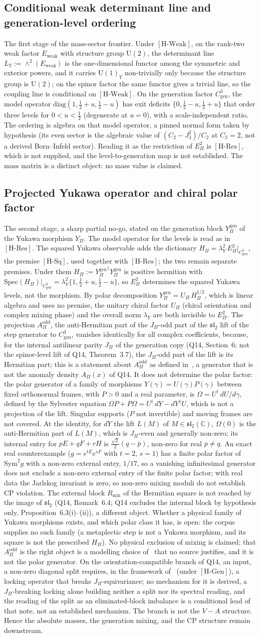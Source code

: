 \documentclass[11pt,a4paper]{article}
\theoremstyle{definition}
\newcommand{\UU}{\mathrm{U}}
\newcommand{\Epi}{E_\Pi}
\newcommand{\Cgen}{C^3_{\mathrm{gen}}}
\newcommand{\Ew}{E_{\mathrm{weak}}}
\newcommand{\HWeak}{\ensuremath{[\mathrm{H\text{-}Weak}]}}
\newcommand{\HRes}{\ensuremath{[\mathrm{H\text{-}Res}]}}
\newcommand{\HSq}{\ensuremath{[\mathrm{H\text{-}Sq}]}}
\newcommand{\HGen}{\ensuremath{[\mathrm{H\text{-}Gen}]}}
\newcommand{\Ypi}{Y_\Pi}
\newcommand{\Ygen}{{Y^{\mathrm{gen}}_\Pi}}
\newcommand{\AOdd}{A_\Pi^{\mathrm{odd}}}
\newcommand{\AClause}{%
  The projection $\AOdd$, the anti-Hermitian part of the $J_\Pi$-odd part of the $\mathfrak{sl}_2$ lift of the step
  generator to $\Cgen$, vanishes identically for all complex coefficients, because, for the internal antilinear
  parity $J_\Pi$ of the generation copy (Q14, Section~6; not the spinor-level lift of Q14, Theorem~3.7), the
  $J_\Pi$-odd part of the lift is its Hermitian part; this is a statement about $\AOdd$ as defined
  in~\cite{Beau2026pyo}, a generator that is not the anomaly density $A_\Pi(x)$ of Q14.
  It does not determine the polar factor: the polar generator of a family of morphisms $Y(\gamma)=U(\gamma)P(\gamma)$
  between fixed orthonormal frames, with $P>0$ and a real parameter, is $\Omega=U^\dagger\,dU/d\gamma$, defined by the
  Sylvester equation $\Omega P+P\Omega=U^\dagger\,dY-dY^\dagger U$, which is not a projection of the lift.
  Singular supports ($P$ not invertible) and moving frames are not covered.
  At the identity, for $dY$ the lift $L(M)$ of $M\in\mathfrak{sl}_2(\mathbb{C})$, $\Omega(0)$ is the anti-Hermitian part
  of $L(M)$, which is $J_\Pi$-even and generally non-zero; its internal entry for $pE+qF+rH$ is
  $\tfrac{\sqrt2}{2}(q-\bar p)$, non-zero for real $p\neq q$.
  An exact real counterexample ($g=e^{tE}e^{sF}$ with $t=2$, $s=1$) has a finite polar factor of $\mathrm{Sym}^2 g$
  with a non-zero external entry, $1/17$, so a vanishing infinitesimal generator does not exclude a non-zero
  external entry of the finite polar factor; with real data the Jarlskog invariant is zero, so non-zero mixing
  moduli do not establish CP violation.
  The external block $R_{\mathrm{mix}}$ of the Hermitian square is not reached by the image of $\mathfrak{sl}_2$ (Q14,
  Remark~6.4; Q14 excludes the internal block by hypothesis only, Proposition~6.3(i)--(ii)), a different object.
  Whether a physical family of Yukawa morphisms exists, and which polar class it has, is open: the corpus supplies
  no such family (a metaplectic step is not a Yukawa morphism, and its square is not the prescribed $H_\Pi$).
  No physical exclusion of mixing is claimed; that $\AOdd$ is the right object is a modelling choice
  of~\cite{Beau2026pyo} that no source justifies, and it is not the polar generator.%
}
\begin{document}
    \subsection{Conditional weak determinant line and generation-level ordering~\cite{Beau2026pyl}}
      The first stage of the mass-sector frontier.
      Under \HWeak{}, on the rank-two weak factor $\Ew$ with structure group $\UU(2)$, the determinant line
      $L_Y:=\wedge^2(\Ew)$ is the one-dimensional functor among the symmetric and exterior powers, and it
      carries $\UU(1)_Y$ non-trivially only because the structure group is $\UU(2)$; on the spinor factor the same
      functor gives a trivial line, so the coupling line is conditional on \HWeak{}.
      On the generation factor $\Cgen$, the model operator $\mathrm{diag}(1,\tfrac12+u,\tfrac12-u)$ has exit deficits
      $\{0,\tfrac12-u,\tfrac12+u\}$ that order three levels for $0<u<\tfrac12$ (degenerate at $u=0$), with a
      scale-independent ratio.
      The ordering is algebra on that model operator, a pinned normal form taken by hypothesis (its even sector is the
      algebraic value of $(C_2-J_3^2)/C_2$ at $C_2=2$, not a derived Born--Infeld sector).
      Reading it as the restriction of $\Epi^2$ is \HRes{}, which is not supplied, and the level-to-generation map is
      not established.
      The mass matrix is a distinct object: no mass value is claimed.

    \subsection{Projected Yukawa operator and chiral polar factor~\cite{Beau2026pyo}}
      The second stage, a sharp partial no-go, stated on the generation block $\Ygen$ of the Yukawa morphism $\Ypi$.
      The model operator for the levels is read as in \HRes{}.
      The squared Yukawa observable adds the dictionary $H_\Pi=\lambda_Y^2\,\Epi^2|_{\Cgen}$, the premise \HSq{},
      used together with \HRes{}; the two remain separate premises.
      Under them $H_\Pi:=\Ygen^\dagger\Ygen$ is positive hermitian with
      $\mathrm{Spec}(H_\Pi)|_{\Cgen}=\lambda_Y^2\{1,\tfrac12+u,\tfrac12-u\}$, so $\Epi^2$ determines the squared
      Yukawa levels, not the morphism.
      By polar decomposition $\Ygen=U_\Pi\,H_\Pi^{1/2}$, which is linear algebra and uses no premise, the unitary
      chiral factor $U_\Pi$ (chiral orientation and complex mixing phase) and the overall norm $\lambda_Y$ are both
      invisible to $\Epi^2$.
      \AClause{}
      On the orientation-compatible branch of Q14, an input, a non-zero diagonal split requires, in the framework
      of~\cite{Beau2026prs} (under \HGen{}), a locking operator that breaks $J_\Pi$-equivariance; no mechanism for it is
      derived, a $J_\Pi$-breaking locking alone building neither a split nor its spectral reading, and the reading of
      the split as an eliminated-block imbalance is a conditional lead of that note, not an established mechanism.
      The branch is not the $V-A$ structure.
      Hence the absolute masses, the generation mixing, and the CP structure remain downstream.
\end{document}
